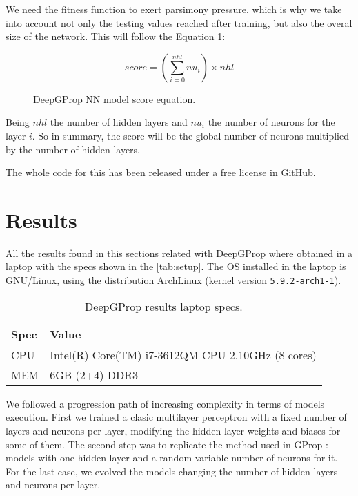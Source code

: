 \documentclass[runningheads]{llncs}
\begin{document}
We need the fitness function to exert parsimony pressure, which is why
we take into account not only the testing values reached after
training, but also the overal size of the network. This will follow
the Equation \ref{eq:hidden-score}:

\begin{figure}
    \centering
    \caption{
        DeepGProp NN model score equation.
    }
    \label{eq:hidden-score}
    \begin{equation}
        score = (\sum_{i=0}^{nhl} nu_{i}) \times nhl
    \end{equation}
\end{figure}

Being $nhl$ the number of hidden layers and $nu_{i}$ the number
of neurons for the layer $i$. So in summary, the score will be the
global number of neurons multiplied by the number of hidden layers.

The whole code for this has been released under a free license in
GitHub. %

\section{Results}
\label{sec:res}


All the results found in this sections related with DeepGProp
\cite{deep-g-prop} where obtained in a laptop with the specs shown in the
\autoref{tab:setup}. The OS installed in the laptop is GNU/Linux, using the
distribution ArchLinux (kernel version \texttt{5.9.2-arch1-1}).

\begin{table}[]
  \centering
  \caption{DeepGProp results laptop specs.}
  \label{tab:setup}
  \begin{tabular}{|l|l|}
  \hline
    Spec & Value                                             \\ \hline
    CPU  & Intel(R) Core(TM) i7-3612QM CPU 2.10GHz (8 cores) \\ \hline
    MEM  & 6GB (2+4) DDR3                                    \\ \hline
  \end{tabular}
\end{table}

We followed a progression path of increasing complexity in terms of models
execution. First we trained a clasic multilayer perceptron with a fixed number
of layers and neurons per layer, modifying the hidden layer weights and biases
for some of them. The second step was to replicate the method used in GProp
\cite{castilloNC,CastilloNPL}: models with one hidden layer and a random
variable number of neurons for it. For the last case, we evolved the models
changing the number of hidden layers and neurons per layer.
\end{document}
